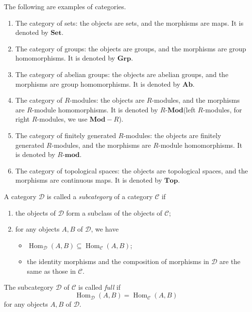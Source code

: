 \begin{example}
    The following are examples of categories.
    \begin{enumerate}
        \item The category of sets: the objects are sets, and the morphisms are maps. It is denoted by $\mathbf{Set}$.

        \item The category of groups: the objects are groups, and the morphisms are group homomorphisms. It is denoted by $\mathbf{Grp}$.

        \item The category of abelian groups: the objects are abelian groups, and the morphisms are group homomorphisms. It is denoted by $\mathbf{Ab}$.

        \item The category of $R$-modules: the objects are $R$-modules, and the morphisms are $R$-module homomorphisms. It is denoted by $R\text{-}\mathbf{Mod}$(left $R$-modules, for right $R$-modules, we use $\mathbf{Mod}-R$).

        \item The category of finitely generated $R$-modules: the objects are finitely generated $R$-modules, and the morphisms are $R$-module homomorphisms. It is denoted by $R\text{-}\mathbf{mod}$.

        \item The category of topological spaces: the objects are topological spaces, and the morphisms are continuous maps. It is denoted by $\mathbf{Top}$.
    \end{enumerate}
\end{example}

\begin{definition}[Subcategory]
    A category $\mathcal{D}$ is called a \emph{subcategory} of a category $\mathcal{C}$ if
    \begin{enumerate}
        \item the objects of $\mathcal{D}$ form a subclass of the objects of $\mathcal{C}$;
        \item for any objects $A,B$ of $\mathcal{D}$, we have
              \begin{itemize}
                  \item $\operatorname{Hom}_{\mathcal{D}}(A,B)\subseteq \operatorname{Hom}_{\mathcal{C}}(A,B)$;
                  \item the identity morphisms and the composition of morphisms in $\mathcal{D}$ are the same as those in $\mathcal{C}$.
              \end{itemize}
    \end{enumerate}

    The subcategory $\mathcal{D}$ of $\mathcal{C}$ is called \emph{full} if
    \[
        \operatorname{Hom}_{\mathcal{D}}(A,B)=\operatorname{Hom}_{\mathcal{C}}(A,B)
    \]
    for any objects $A,B$ of $\mathcal{D}$.
\end{definition}

